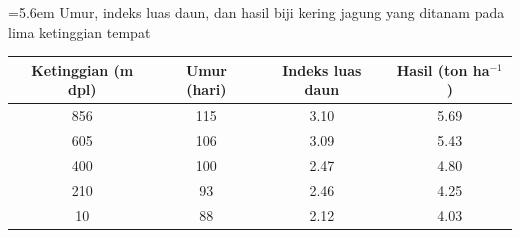 \clearpage


\label{lamp:jagung}

\noindent\hangindent=5.6em
%
Umur, indeks luas daun, dan hasil biji kering jagung yang ditanam pada
lima ketinggian tempat

\vspace{4pt}

\noindent
\begin{tabular}{cccc}
  \toprule
  Ketinggian (m dpl) & Umur (hari) & Indeks luas daun & Hasil (ton ha$^{-1}$) \\
  \midrule
  856 & 115 & 3.10 & 5.69 \\
  605 & 106 & 3.09 & 5.43 \\
  400 & 100 & 2.47 & 4.80 \\
  210 &  93 & 2.46 & 4.25 \\
   10 &  88 & 2.12 & 4.03 \\
  \bottomrule
\end{tabular}
